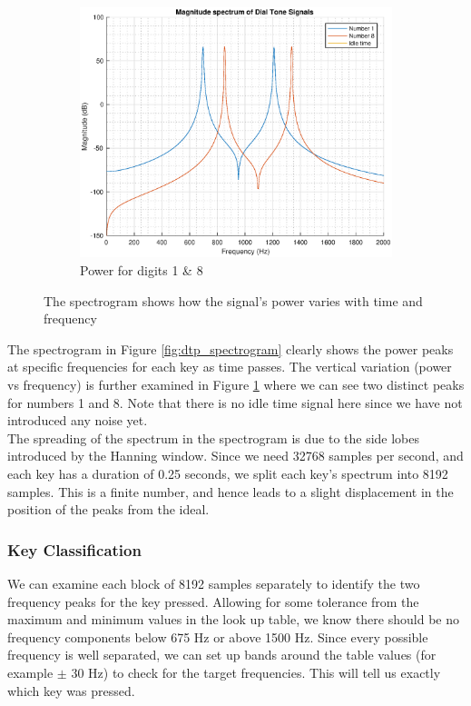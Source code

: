 \documentclass{article}
\begin{document}
\begin{figure}[h!]
\begin{subfigure}{0.32\textwidth}
\centering
\includegraphics[width = \textwidth]{dtp_magspec}
\caption{Power for digits 1 \& 8}
\label{fig:dtp_magspec}
\end{subfigure}
\caption{The spectrogram shows how the signal's power varies with time and frequency}
\label{fig:ar_spec_sunspot}
\end{figure}

The spectrogram in Figure \ref{fig:dtp_spectrogram} clearly shows the power peaks at specific frequencies for each key as time passes. The vertical variation (power vs frequency) is further examined in Figure \ref{fig:dtp_magspec} where we can see two distinct peaks for numbers 1 and 8. Note that there is no idle time signal here since we have not introduced any noise yet.\\

The spreading of the spectrum in the spectrogram is due to the side lobes introduced by the Hanning window. Since we need 32768 samples per second, and each key has a duration of 0.25 seconds, we split each key's spectrum into 8192 samples. This is a finite number, and hence leads to a slight displacement in the position of the peaks from the ideal.

\subsubsection{Key Classification}

We can examine each block of 8192 samples separately to identify the two frequency peaks for the key pressed. Allowing for some tolerance from the maximum and minimum values in the look up table, we know there should be no frequency components below 675 Hz or above 1500 Hz. Since every possible frequency is well separated, we can set up bands around the table values (for example $\pm$ 30 Hz) to check for the target frequencies. This will tell us exactly which key was pressed.
\end{document}
